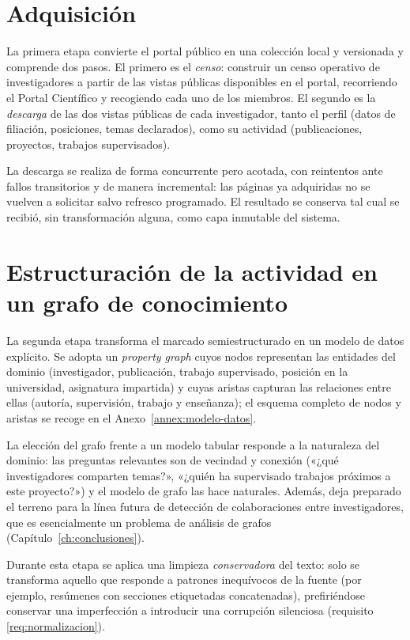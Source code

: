\section{Adquisición}
\label{sec:met-adquisicion}

La primera etapa convierte el portal público en una colección local y versionada y comprende dos pasos.
El primero es el \emph{censo}: construir un censo operativo de investigadores a partir de las vistas públicas disponibles en el portal, recorriendo el Portal Científico y recogiendo cada uno de los miembros.
El segundo es la \emph{descarga} de las dos vistas públicas de cada investigador, tanto el perfil (datos de filiación, posiciones, temas declarados), como su actividad (publicaciones, proyectos, trabajos supervisados).

La descarga se realiza de forma concurrente pero acotada, con reintentos ante fallos transitorios y de manera incremental: las páginas ya adquiridas no se vuelven a solicitar salvo refresco programado.
El resultado se conserva tal cual se recibió, sin transformación alguna, como capa inmutable del sistema.


\section{Estructuración de la actividad en un grafo de conocimiento}
\label{sec:met-grafo}

La segunda etapa transforma el marcado semiestructurado en un modelo de datos explícito.
Se adopta un \emph{property graph} cuyos nodos representan las entidades del dominio (investigador, publicación, trabajo supervisado, posición en la universidad, asignatura impartida) y cuyas aristas capturan las relaciones entre ellas (autoría, supervisión, trabajo y enseñanza); el esquema completo de nodos y aristas se recoge en el Anexo~\ref{annex:modelo-datos}.

La elección del grafo frente a un modelo tabular responde a la naturaleza del dominio: las preguntas relevantes son de vecindad y conexión («¿qué investigadores comparten temas?», «¿quién ha supervisado trabajos próximos a este proyecto?») y el modelo de grafo las hace naturales.
Además, deja preparado el terreno para la línea futura de detección de colaboraciones entre investigadores, que es esencialmente un problema de análisis de grafos (Capítulo~\ref{ch:conclusiones}).

Durante esta etapa se aplica una limpieza \emph{conservadora} del texto: solo se transforma aquello que responde a patrones inequívocos de la fuente (por ejemplo, resúmenes con secciones etiquetadas concatenadas), prefiriéndose conservar una imperfección a introducir una corrupción silenciosa (requisito \ref{req:normalizacion}).

